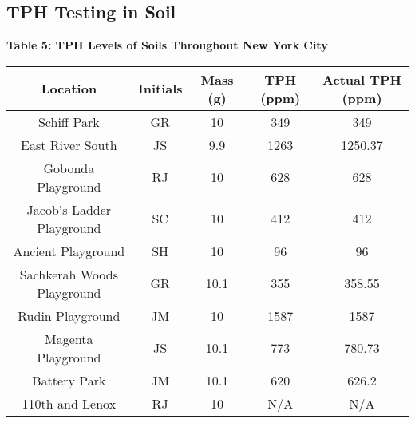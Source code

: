 \subsection{TPH Testing in Soil}
\begin{center}
\vspace{5mm}
{\large {\bf Table 5: TPH Levels of Soils Throughout New York City\\}}
\vspace{2mm}
\begin{tabular}{|ccccc|}
    \hline
    \textbf{Location}           & \textbf{Initials} & \textbf{Mass (g)} & \textbf{TPH (ppm)} & \textbf{Actual TPH (ppm)}  \\\hline
    Schiff Park                 & GR                & 10                & 349                        & 349                                \\
    East River South            & JS                & 9.9               & 1263                       & 1250.37                            \\
    Gobonda Playground          & RJ                & 10                & 628                        & 628                                \\
    Jacob's Ladder Playground   & SC                & 10                & 412                        & 412                                \\
    Ancient Playground          & SH                & 10                & 96                         & 96                                 \\
    Sachkerah Woods Playground  & GR                & 10.1              & 355                        & 358.55                             \\
    Rudin Playground            & JM                & 10                & 1587                       & 1587                               \\
    Magenta Playground          & JS                & 10.1              & 773                        & 780.73                             \\
    Battery Park                & JM                & 10.1              & 620                        & 626.2                              \\
    110th and Lenox             & RJ                & 10                & N/A                        & N/A                                \\

\end{tabular}
\end{center}
